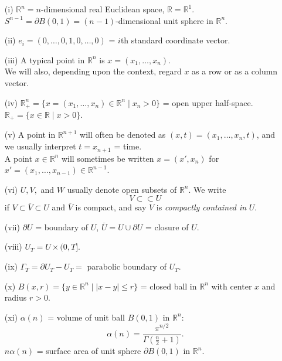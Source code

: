 \documentclass[oneside]{book}
\begin{document}
		\begin{itemize}
			\item[(i)] \( \mathbb{R}^n = n \)-dimensional real Euclidean space, \( \mathbb{R} = \mathbb{R}^1 \). \\
			\( S^{n-1} = \partial B(0, 1) = (n-1)\)-dimensional unit sphere in \( \mathbb{R}^n \).
			
			\item[(ii)] \( e_i = (0, \dots, 0, 1, 0, \dots, 0) \) = \( i \)th standard coordinate vector.
			
			\item[(iii)] A typical point in \( \mathbb{R}^n \) is \( x = (x_1, \dots, x_n) \). \\
			We will also, depending upon the context, regard \( x \) as a row or as a column vector.
			
			\item[(iv)] \( \mathbb{R}^n_+ = \{ x = (x_1, \dots, x_n) \in \mathbb{R}^n \mid x_n > 0 \} \) = open upper half-space. \\
			\( \mathbb{R}_+ = \{ x \in \mathbb{R} \mid x > 0 \} \).
			
			\item[(v)] A point in \( \mathbb{R}^{n+1} \) will often be denoted as \( (x, t) = (x_1, \dots, x_n, t) \), and we usually interpret \( t = x_{n+1} \) = time. \\
			A point \( x \in \mathbb{R}^n \) will sometimes be written \( x = (x', x_n) \) for \( x' = (x_1, \dots, x_{n-1}) \in \mathbb{R}^{n-1} \).
			
			\item[(vi)] \( U, V, \) and \( W \) usually denote open subsets of \( \mathbb{R}^n \). We write
			\[
			V \subset\subset U
			\]
			if \( V \subset \overline{V} \subset U \) and \( \overline{V} \) is compact, and say \( V \) is \textit{compactly contained in} \( U \).
			
			\item[(vii)] \( \partial U \) = boundary of \( U \), \( \overline{U} = U \cup \partial U \) = closure of \( U \).
			
			\item[(viii)] \( U_T = U \times (0, T] \).
			
			\item[(ix)] \( \Gamma_T = \partial U_T - U_T = \) parabolic boundary of \( U_T \).
			
			\item[(x)] \( B(x, r) = \{ y \in \mathbb{R}^n \mid |x - y| \leq r \} \) = closed ball in \( \mathbb{R}^n \) with center \( x \) and radius \( r > 0 \).
			
			\item[(xi)] \( \alpha(n) \) = volume of unit ball \( B(0, 1) \) in \( \mathbb{R}^n \):
			\[
			\alpha(n) = \frac{\pi^{n/2}}{\Gamma\left(\frac{n}{2} + 1\right)}.
			\]
			\( n\alpha(n) \) = surface area of unit sphere \( \partial B(0, 1) \) in \( \mathbb{R}^n \).
		\end{itemize}
\end{document}
